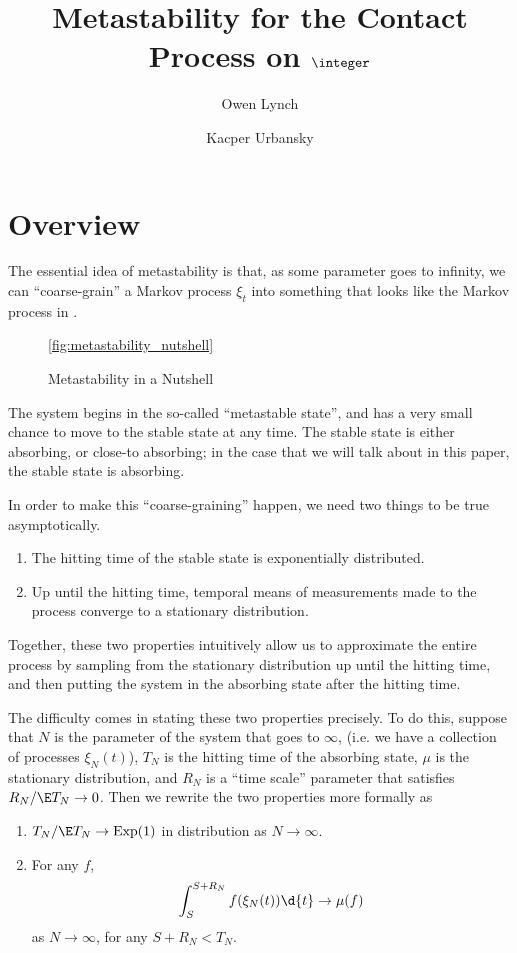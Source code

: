 \documentclass{scrartcl}
\title{Metastability for the Contact Process on $\integer$}
\author{Owen Lynch \and Kacper Urbansky}
\DeclareMathOperator{\expDist}{Exp}
\begin{document}
\maketitle

\section{Overview}

The essential idea of metastability is that, as some parameter goes to infinity, we can ``coarse-grain'' a Markov process $\xi_{t}$ into something that looks like the Markov process in .

\begin{figure}[h!]
  \centering

  \caption{Metastability in a Nutshell}
  \ref{fig:metastability_nutshell}
\end{figure}

The system begins in the so-called ``metastable state'', and has a very small chance to move to the stable state at any time. The stable state is either absorbing, or close-to absorbing; in the case that we will talk about in this paper, the stable state is absorbing.

In order to make this ``coarse-graining'' happen, we need two things to be true asymptotically.

\begin{enumerate}
  \item The hitting time of the stable state is exponentially distributed.
  \item Up until the hitting time, temporal means of measurements made to the process converge to a stationary distribution.
\end{enumerate}

Together, these two properties intuitively allow us to approximate the entire process by sampling from the stationary distribution up until the hitting time, and then putting the system in the absorbing state after the hitting time.

The difficulty comes in stating these two properties precisely. To do this, suppose that $N$ is the parameter of the system that goes to $\infty$, (i.e. we have a collection of processes $\xi_{N}(t)$), $T_{N}$ is the hitting time of the absorbing state, $\mu$ is the stationary distribution, and $R_{N}$ is a ``time scale'' parameter that satisfies $R_{N}/\E T_{N} \to 0$. Then we rewrite the two properties more formally as

\begin{enumerate}
  \item $T_{N} / \E T_{N} \to \expDist(1)$ in distribution as $N \to \infty$.
  \item For any $f$,
    \[ \int_{S}^{S + R_{N}} f(\xi_{N}(t)) \d{t} \to \mu(f) \]
    as $N \to \infty$, for any $S + R_{N} < T_{N}$.
\end{enumerate}
\end{document}
